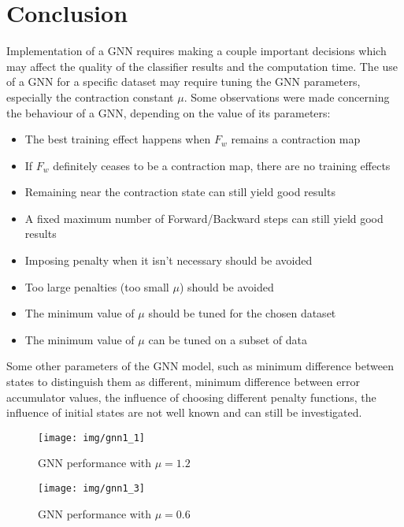 \documentclass[]{spie}  %
\begin{document}
\newpage
\section{Conclusion}
Implementation of a GNN requires making a couple important decisions which may affect the quality of the classifier results and the computation time. The use of a GNN for a specific dataset may require tuning the GNN parameters, especially the contraction constant $\mu$. Some observations were made concerning the behaviour of a GNN, depending on the value of its parameters:
\begin{itemize}
	\item The best training effect happens when $F_w$ remains a contraction map
	\item If $F_w$ definitely ceases to be a contraction map, there are no training effects
	\item Remaining near the contraction state can still yield good results
	\item A fixed maximum number of Forward/Backward steps can still yield good results
	\item Imposing penalty when it isn't necessary should be avoided
	\item Too large penalties (too small $\mu$) should be avoided
	\item The minimum value of $\mu$ should be tuned for the chosen dataset
	\item The minimum value of $\mu$ can be tuned on a subset of data
\end{itemize}
Some other parameters of the GNN model, such as minimum difference between states to distinguish them as different, minimum difference between error accumulator values, the influence of choosing different penalty functions, the influence of initial states are not well known and can still be investigated.





\begin{figure}
\begin{center}
	\texttt{[image: img/gnn1\_1]}
	\caption{GNN performance with $\mu = 1.2$}
	\label{fig:rmse1}
\end{center}
\end{figure}

\begin{figure}
\begin{center}
	\texttt{[image: img/gnn1\_3]}
	\caption{GNN performance with $\mu = 0.6$}
	\label{fig:rmse3}
\end{center}
\end{figure}
\end{document}
